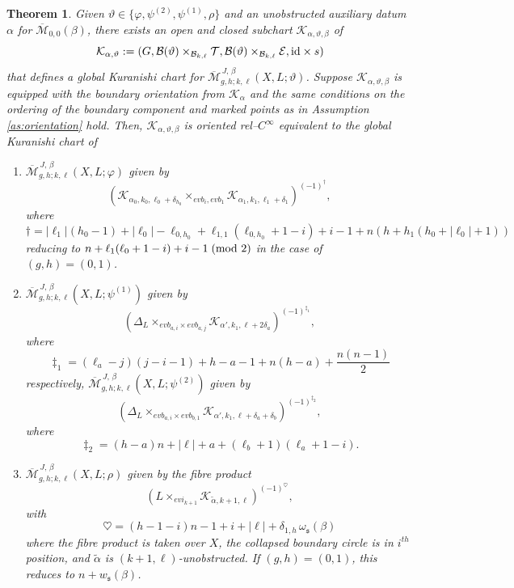 \documentclass[11pt,psamsfonts, oneside, reqno]{amsart}
\newcommand{\ide}{\normalfont\text{id}}
\newcommand{\Mbar}{\overline{\mathcal M}}
\newcommand{\cB}{\mathcal{B}}
\newcommand{\cE}{\mathcal{E}}
\newcommand{\cK}{\mathcal{K}}
\newcommand{\cT}{\mathcal{T}}
\newcommand{\fs}{\mathfrak{s}}
\newcommand{\wt}{\widetilde}
\newcommand{\evai}{evi}
\newcommand{\evab}{evb}
\newcommand{\obs}{s}
\newcommand{\M}[1]{\Mbar_{#1}}
\newtheorem{theorem}{Theorem}[section]
\theoremstyle{definition}
\theoremstyle{remark}
\numberwithin{equation}{section}
\begin{document}
\begin{theorem}\label{thm:boundary-strata-equivalent} Given $\vartheta \in \{\varphi,\psi^{(2)},\psi^{(1)},\rho\}$ and an unobstructed auxiliary datum $\alpha$ for $\M{0,0}(\beta)$, there exists an open and closed subchart $\cK_{\alpha,\vartheta,\beta}$ of 
		$$\cK_{\alpha,\vartheta}:= (G,\cB(\vartheta)\times_{\cB_{k,\ell}}\cT,\cB(\vartheta)\times_{\cB_{k,\ell}}\cE,\ide\times\obs)$$\noindent
		that defines a global Kuranishi chart for $\Mbar^{\,J,\,\beta}_{g,h;k,\ell}(X,L;\vartheta)$.
		Suppose $\cK_{\alpha,\vartheta,\beta}$ is equipped with the boundary orientation from $\cK_\alpha$ and the same conditions on the ordering of the boundary component and marked points as in Assumption \ref{as:orientation} hold. Then, $\cK_{\alpha,\vartheta,\beta}$ is oriented rel--$C^\infty$ equivalent to the global Kuranishi chart of 
		\begin{enumerate}[label=\arabic*),leftmargin=20pt,ref=\arabic*]
			\setlength\itemsep{3pt}
			\item\label{or-gluing-hg-1} $\Mbar^{\,J,\,\beta}_{g,h;k,\ell}(X,L;\varphi)$ given by $$(\cK_{\alpha_0,k_0,\ell_0+\delta_{h_0}}\times_{\evab_i,\evab_1}\cK_{\alpha_1,k_1,\ell_1+\delta_{1}})^{(-1)^{\dagger}},$$\noindent
			where 
			\begin{equation}\label{sign-h3}\dagger = |\ell_1|(h_0-1) + |\ell_0|-\ell_{0,h_0} + \ell_{1,1}(\ell_{0,h_0}+ 1-i) + i-1 + n(h +h_1(h_0 + |\ell_0|+1))\end{equation}
			reducing to $n+\ell_1(\ell_0+1-i) +i-1\;(\normalfont\text{mod }2)$ in the case of $(g,h) = (0,1)$. 
			\item\label{or-gluing-hg-2}  $\Mbar^{\,J,\,\beta}_{g,h;k,\ell}(X,L;\psi^{(1)})$ given by $$(\Delta_L\times_{\evab_{a,i}\times\evab_{a,j}}\cK_{\alpha',k_1,\ell+2\delta_a})^{(-1)^{\ddagger_1}},$$\noindent
			where 
			\begin{equation}\label{sign-h1}\ddagger_1 = (\ell_a-j)(j-i-1) + h-a-1 +n(h-a)+\frac{n(n-1)}{2} \end{equation}
			respectively,  $\Mbar^{\,J,\,\beta}_{g,h;k,\ell}(X,L;\psi^{(2)})$ given by $$(\Delta_L\times_{\evab_{a,i}\times\evab_{b,1}}\cK_{\alpha',k_1,\ell+\delta_a +\delta_b})^{(-1)^{\ddagger_2}},$$\noindent
			where 
			\begin{equation}\label{sign-h2}\ddagger_2 =   (h-a)n +|\ell| + a +( \ell_{b}+1)(\ell_{a}+1-i).\end{equation}
			\item\label{or-gluing-hg-3} $\Mbar_{g,h;k,\ell}^{\,J,\,\beta}(X,L;\rho)$ given by the fibre product 
			$$(L \times_{\evai_{k+1}}\cK_{\wt\alpha,k+1,\ell})^{(-1)^{\heartsuit}},$$\noindent 
			with
			 \begin{equation}\label{sign-e}\heartsuit =  (h-1-i)n-1+i +|\ell|+\delta_{1,h}\,\omega_\fs(\beta)\end{equation}
			where the fibre product is taken over $X$, the collapsed boundary circle is in $i^{th}$ position, and $\wt\alpha$ is $(k+1,\ell)$-unobstructed. If $(g,h) = (0,1)$, this reduces to $n + w_\fs(\beta)$.
		\end{enumerate}
	\end{theorem} 
	
\end{document}
